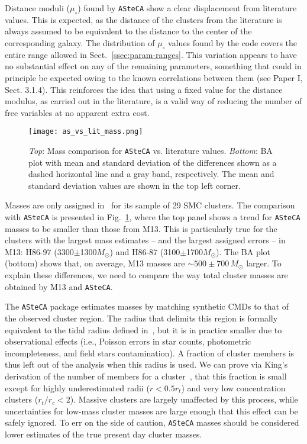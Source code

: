 \documentclass{aa}
\begin{document}
Distance moduli ($\mu_{\circ}$) found by \texttt{ASteCA} show a clear
displacement from literature values. This is expected, as the distance of the
clusters from the literature is always assumed to be equivalent to the
distance to the center of the corresponding galaxy.
The distribution of $\mu_{\circ}$ values found by the code covers the entire
range allowed in Sect.~\ref{ssec:param-ranges}.
%
This variation appears to have no substantial effect on
any of the remaining parameters, something that could in principle be expected
owing to the known correlations between them (see Paper I, Sect. 3.1.4).
This reinforces the idea that using a fixed value for the distance modulus, as
carried out in the literature, is a valid way of reducing the number of free variables
at no apparent extra cost.\\

\begin{figure}
\centering
\texttt{[image: as\_vs\_lit\_mass.png]}
\caption{\emph{Top}: Mass comparison for \texttt{ASteCA} vs. literature
values.
\emph{Bottom}: BA plot with mean and standard deviation of the differences
shown as a dashed horizontal line and a gray band, respectively. The mean and
standard deviation values are shown in the top left corner.}
\label{fig:as_vs_lit_mass}
\end{figure}

Masses are only assigned in~\citet[][M13]{Maia_2013} for its sample of 29
SMC clusters. The comparison with \texttt{ASteCA} is presented in
Fig.~\ref{fig:as_vs_lit_mass}, where the top panel shows a trend for
\texttt{ASteCA} masses to be smaller than those from M13. This is particularly
true for the clusters with the largest mass estimates -- and the largest
assigned errors -- in M13: H86-97 (3300$\pm$1300$M_{\odot}$) and H86-87
(3100$\pm$1700$M_{\odot}$). The BA plot (bottom) shows that, on average, M13
masses are ${\sim}500{\pm}700\,M_{\odot}$ larger.
%
To explain these differences, we need to compare the way total cluster masses
are obtained by M13 and \texttt{ASteCA}.

The \texttt{ASteCA} package estimates masses by matching synthetic CMDs
to that of the observed cluster region.
The radius that delimits this region is formally equivalent to the
tidal radius defined in~\cite[][see Sect.~\ref{ssec:centre-radius}]{King_1962},
but it is in practice smaller due to observational effects (i.e., Poisson
errors in star counts, photometric incompleteness, and field stars contamination).
%
A fraction of cluster members is thus left out of the analysis when this radius
is used. We can prove via King's derivation of the number of
members for a cluster~\citep[Eq. 18,][]{King_1962}, that this fraction is small
except for highly underestimated radii ($r{<}0.5r_t$) and very low concentration
clusters ($r_t/r_c{<}2$).
%
Massive clusters are largely unaffected by this process, while uncertainties for
low-mass cluster masses are large enough that this effect can be safely
ignored. To err on the side of caution, \texttt{ASteCA} masses should be
considered lower estimates of the true present day cluster masses.
\end{document}
